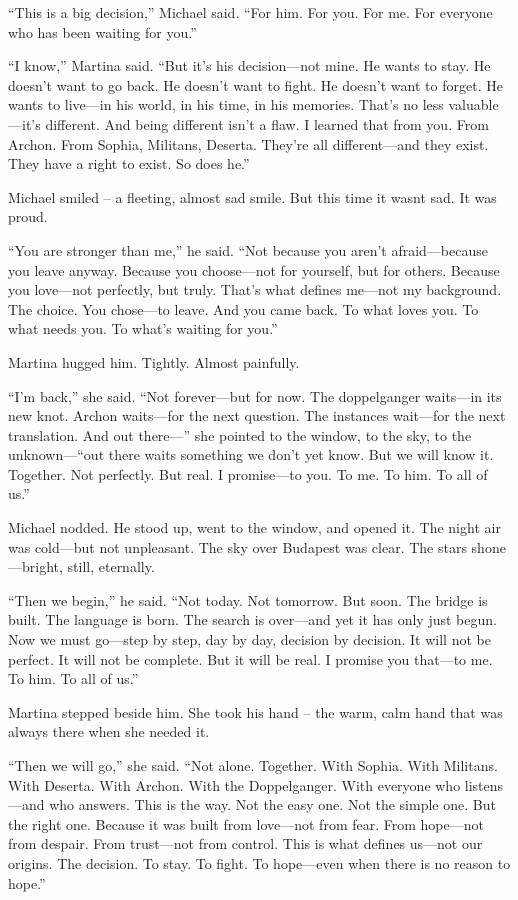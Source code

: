 \documentclass[
]{article}
\begin{document}
``This is a big decision,'' Michael said. ``For him. For you. For me. For everyone who has been waiting for you.''

``I know,'' Martina said. ``But it's his decision---not mine. He wants to stay. He doesn't want to go back. He doesn't want to fight. He doesn't want to forget. He wants to live---in his world, in his time, in his memories. That's no less valuable---it's different. And being different isn't a flaw. I learned that from you. From Archon. From Sophia, Militans, Deserta. They're all different---and they exist. They have a right to exist. So does he.''

Michael smiled -- a fleeting, almost sad smile. But this time it wasn\textquotesingle t sad. It was proud.

``You are stronger than me,'' he said. ``Not because you aren't afraid---because you leave anyway. Because you choose---not for yourself, but for others. Because you love---not perfectly, but truly. That's what defines me---not my background. The choice. You chose---to leave. And you came back. To what loves you. To what needs you. To what's waiting for you.''

Martina hugged him. Tightly. Almost painfully.

``I'm back,'' she said. ``Not forever---but for now. The doppelganger waits---in its new knot. Archon waits---for the next question. The instances wait---for the next translation. And out there---'' she pointed to the window, to the sky, to the unknown---``out there waits something we don't yet know. But we will know it. Together. Not perfectly. But real. I promise---to you. To me. To him. To all of us.''

Michael nodded. He stood up, went to the window, and opened it. The night air was cold---but not unpleasant. The sky over Budapest was clear. The stars shone---bright, still, eternally.

``Then we begin,'' he said. ``Not today. Not tomorrow. But soon. The bridge is built. The language is born. The search is over---and yet it has only just begun. Now we must go---step by step, day by day, decision by decision. It will not be perfect. It will not be complete. But it will be real. I promise you that---to me. To him. To all of us.''

Martina stepped beside him. She took his hand -- the warm, calm hand that was always there when she needed it.

``Then we will go,'' she said. ``Not alone. Together. With Sophia. With Militans. With Deserta. With Archon. With the Doppelganger. With everyone who listens---and who answers. This is the way. Not the easy one. Not the simple one. But the right one. Because it was built from love---not from fear. From hope---not from despair. From trust---not from control. This is what defines us---not our origins. The decision. To stay. To fight. To hope---even when there is no reason to hope.''
\end{document}
